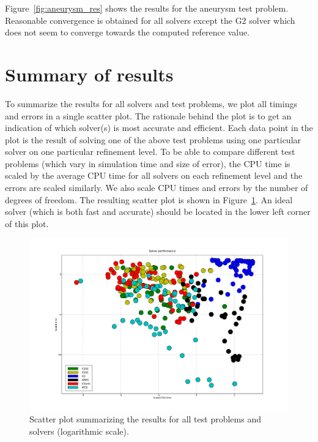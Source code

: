 Figure~\ref{fig:aneurysm_res} shows the results for the aneurysm test
problem. Reasonable convergence is obtained for all solvers except the
G2 solver which does not seem to converge towards the computed
reference value.

\section{Summary of results}

To summarize the results for all solvers and test problems, we plot
all timings and errors in a single scatter plot. The rationale behind
the plot is to get an indication of which solver(s) is most accurate
and efficient. Each data point in the plot is the result of solving
one of the above test problems using one particular solver on one
particular refinement level. To be able to compare different test
problems (which vary in simulation time and size of error), the CPU
time is scaled by the average CPU time for all solvers on each
refinement level and the errors are scaled similarly. We also scale
CPU times and errors by the number of degrees of freedom. The
resulting scatter plot is shown in Figure~\ref{fig:scatter}. An ideal
solver (which is both fast and accurate) should be located in the
lower left corner of this plot.

\begin{figure}
  \begin{center}
 \includegraphics[width=14cm]{chapters/kvs-1/pdf/new_scatter.pdf}
  \end{center}
  \caption{Scatter plot summarizing the results for all test problems
    and solvers (logarithmic scale).}
  \label{fig:scatter}
\end{figure}

